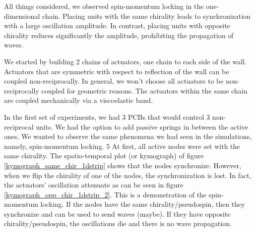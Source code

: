 \documentclass[11pt, a4paper]{article} %
\begin{document}

All things considered, we observed spin-momentum locking in the one-dimensional chain. Placing units with the same chirality 
leads to synchronization with a large oscillation amplitude. In contrast, placing units with opposite chirality reduces 
significantly the amplitude, prohibiting the propagation of waves. 

We started by building 2 chains of actuators, one chain to each side of the wall. %
Actuators that are symmetric with respect to reflection of the wall can be coupled non-reciprocally. %
In general, we won’t choose all actuators to be non-reciprocally 
coupled for geometric reasons. The actuators within the same chain are coupled mechanically via 
a viscoelastic band. 

In the first set of experiments, we had 3 PCBs that would control 3 non-reciprocal units. We had the option to add passive springs 
in between the active ones. We wanted to observe the same phenomena we had seen in the simulations, namely, spin-momentum locking. 
5%
At first, all active nodes were set with the same chirality. The spatio-temporal plot 
(or kymograph) of figure \ref{kymograph_same_chir_1dstrip} shows that the nodes synchronize. 
However, when we flip the chirality of one of the nodes, the synchronization is lost. In fact, the actuators' oscillation attenuate 
as can be seen in figure \ref{kymograph_opp_chir_1dstrip_2}. 
This is a demonstration of the spin-momentum locking. If the nodes have the same chirality/pseudospin, then 
they synchronize and can be used to send waves (maybe). If they have opposite chirality/pseudospin, the oscillations 
die and there is no wave propagation.
\end{document}
